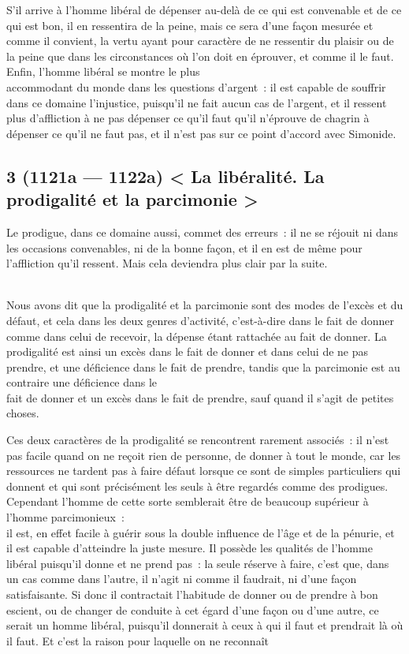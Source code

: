 \documentclass[french,twoside]{book} %
\begin{document}
 S’il arrive à l’homme libéral de dépenser au-delà de ce qui est convenable et de ce qui est bon, il en ressentira de la peine, mais ce sera d’une façon mesurée et comme il convient, la vertu ayant pour caractère de ne ressentir du plaisir ou de la peine que dans les circonstances où l’on doit en éprouver, et comme il le faut. Enfin, l’homme libéral se montre le plus \\
accommodant du monde dans les questions d’argent : il est capable de souffrir dans ce domaine l’injustice, puisqu’il ne fait aucun cas de l’argent, et il ressent plus d’affliction à ne pas dépenser ce qu’il faut qu’il n’éprouve de chagrin à dépenser ce qu’il ne faut pas, et il n’est pas sur ce point d’accord avec Simonide.
\subsection[{3 (1121a — 1122a) < La libéralité. La prodigalité et la parcimonie >}]{3 (1121a — 1122a) < La libéralité. La prodigalité et la parcimonie >}
\noindent Le prodigue, dans ce domaine aussi, commet des erreurs : il ne se réjouit ni dans les occasions convenables, ni de la bonne façon, et il en est de même pour l’affliction qu’il ressent. Mais cela deviendra plus clair par la suite.\par
\\
Nous avons dit que la prodigalité et la parcimonie sont des modes de l’excès et du défaut, et cela dans les deux genres d’activité, c’est-à-dire dans le fait de donner comme dans celui de recevoir, la dépense étant rattachée au fait de donner. La prodigalité est ainsi un excès dans le fait de donner et dans celui de ne pas prendre, et une déficience dans le fait de prendre, tandis que la parcimonie est au contraire une déficience dans le \\
fait de donner et un excès dans le fait de prendre, sauf quand il s’agit de petites choses.\par
Ces deux caractères de la prodigalité se rencontrent rarement associés : il n’est pas facile quand on ne reçoit rien de personne, de donner à tout le monde, car les ressources ne tardent pas à faire défaut lorsque ce sont de simples particuliers qui donnent et qui sont précisément les seuls à être regardés comme des prodigues. Cependant l’homme de cette sorte semblerait être de beaucoup supérieur à l’homme parcimonieux : \\
il est, en effet facile à guérir sous la double influence de l’âge et de la pénurie, et il est capable d’atteindre la juste mesure. Il possède les qualités de l’homme libéral puisqu’il donne et ne prend pas : la seule réserve à faire, c’est que, dans un cas comme dans l’autre, il n’agit ni comme il faudrait, ni d’une façon satisfaisante. Si donc il contractait l’habitude de donner ou de prendre à bon escient, ou de changer de conduite à cet égard d’une façon ou d’une autre, ce serait un homme libéral, puisqu’il donnerait à ceux à qui il faut et prendrait là où il faut. Et c’est la raison pour laquelle on ne reconnaît \\
\end{document}
